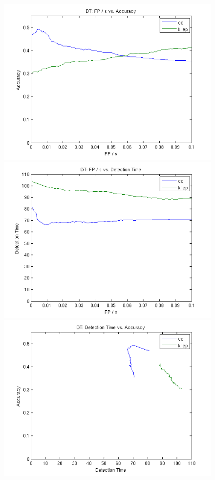 \documentclass[onehalf,11pt]{beavtex}
\begin{document}
\begin{figure}
 \includegraphics[scale=0.3]{dt_fps_acc.png}
 \includegraphics[scale=0.3]{dt_fps_det.png}
 \includegraphics[scale=0.3]{dt_det_acc.png}

\end{figure}
\end{document}
